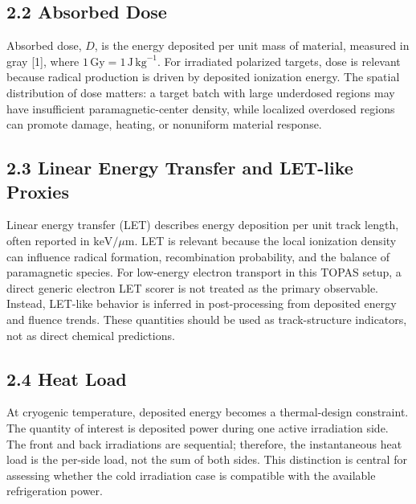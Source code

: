 \documentclass[
  12pt,
]{article}
\begin{document}
\hypertarget{absorbed-dose}{%
\subsection{2.2 Absorbed Dose}\label{absorbed-dose}}

Absorbed dose, \(D\), is the energy deposited per unit mass of material,
measured in gray {[}1{]}, where
\(1\,\mathrm{Gy} = 1\,\mathrm{J}\,\mathrm{kg}^{-1}\). For irradiated
polarized targets, dose is relevant because radical production is driven
by deposited ionization energy. The spatial distribution of dose
matters: a target batch with large underdosed regions may have
insufficient paramagnetic-center density, while localized overdosed
regions can promote damage, heating, or nonuniform material response.

\hypertarget{linear-energy-transfer-and-let-like-proxies}{%
\subsection{2.3 Linear Energy Transfer and LET-like
Proxies}\label{linear-energy-transfer-and-let-like-proxies}}

Linear energy transfer (LET) describes energy deposition per unit track
length, often reported in \(\mathrm{keV}/\mu\mathrm{m}\). LET is
relevant because the local ionization density can influence radical
formation, recombination probability, and the balance of paramagnetic
species. For low-energy electron transport in this TOPAS setup, a direct
generic electron LET scorer is not treated as the primary observable.
Instead, LET-like behavior is inferred in post-processing from deposited
energy and fluence trends. These quantities should be used as
track-structure indicators, not as direct chemical predictions.

\hypertarget{heat-load}{%
\subsection{2.4 Heat Load}\label{heat-load}}

At cryogenic temperature, deposited energy becomes a thermal-design
constraint. The quantity of interest is deposited power during one
active irradiation side. The front and back irradiations are sequential;
therefore, the instantaneous heat load is the per-side load, not the sum
of both sides. This distinction is central for assessing whether the
cold irradiation case is compatible with the available refrigeration
power.
\end{document}
